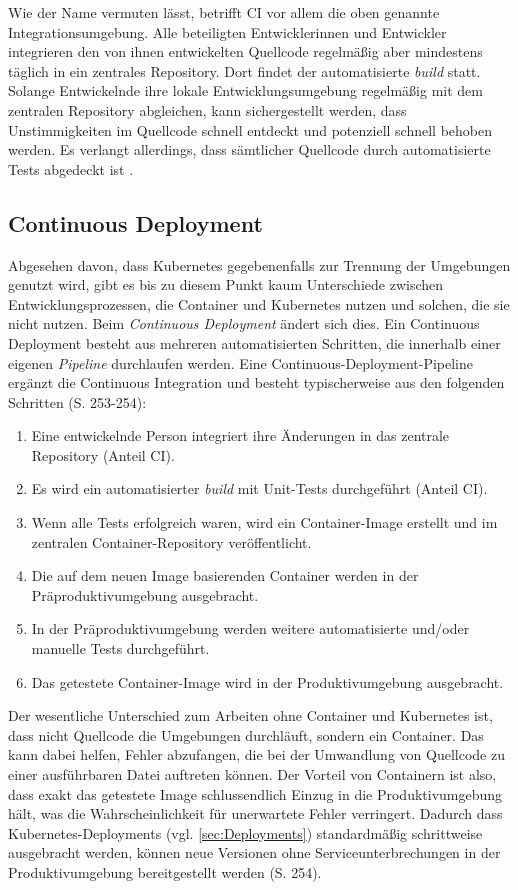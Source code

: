 \documentclass[11pt,a4paper]{article}
\begin{document}
Wie der Name vermuten lässt, betrifft CI vor allem die oben genannte Integrationsumgebung.
Alle beteiligten Entwicklerinnen und Entwickler integrieren den von ihnen
entwickelten Quellcode regelmäßig aber mindestens täglich in ein zentrales
Repository. Dort findet der automatisierte \emph{build} statt.
Solange Entwickelnde ihre lokale Entwicklungsumgebung regelmäßig mit dem
zentralen Repository abgleichen, kann sichergestellt werden, dass
Unstimmigkeiten im Quellcode schnell entdeckt und potenziell schnell behoben werden.
Es verlangt allerdings, dass sämtlicher Quellcode durch automatisierte
Tests abgedeckt ist \cite{fowler_Continuous_Integration}.

\subsection{Continuous Deployment}
Abgesehen davon, dass Kubernetes gegebenenfalls zur Trennung der Umgebungen genutzt wird,
gibt es bis zu diesem Punkt kaum Unterschiede zwischen Entwicklungsprozessen,
die Container und Kubernetes nutzen und solchen, die sie nicht nutzen.
Beim \emph{Continuous Deployment} ändert sich dies.
Ein Continuous Deployment besteht aus mehreren automatisierten Schritten,
die innerhalb einer eigenen \emph{Pipeline} durchlaufen werden.
Eine Continuous-Deployment-Pipeline ergänzt die Continuous Integration
und besteht typischerweise aus den folgenden Schritten \cite{domingus2022cloud} (S. 253-254):
\begin{enumerate}
  \item Eine entwickelnde Person integriert ihre Änderungen in das zentrale Repository (Anteil CI).
  \item Es wird ein automatisierter \emph{build} mit Unit-Tests durchgeführt (Anteil CI).
  \item Wenn alle Tests erfolgreich waren, wird ein Container-Image erstellt und im zentralen Container-Repository veröffentlicht.
  \item Die auf dem neuen Image basierenden Container werden in der Präproduktivumgebung ausgebracht.
  \item In der Präproduktivumgebung werden weitere automatisierte und/oder manuelle Tests durchgeführt.
  \item Das getestete Container-Image wird in der Produktivumgebung ausgebracht.
\end{enumerate}
Der wesentliche Unterschied zum Arbeiten ohne Container und Kubernetes ist, dass nicht Quellcode
die Umgebungen durchläuft, sondern ein Container. Das kann dabei helfen, Fehler abzufangen,
die bei der Umwandlung von Quellcode zu einer ausführbaren Datei auftreten können.
Der Vorteil von Containern ist also, dass exakt das getestete Image schlussendlich
Einzug in die Produktivumgebung hält, was die Wahrscheinlichkeit für unerwartete Fehler verringert.
Dadurch dass Kubernetes-Deployments (vgl. \ref{sec:Deployments}) standardmäßig schrittweise ausgebracht werden,
können neue Versionen ohne Serviceunterbrechungen in der Produktivumgebung bereitgestellt werden \cite{domingus2022cloud} (S. 254).
\end{document}
